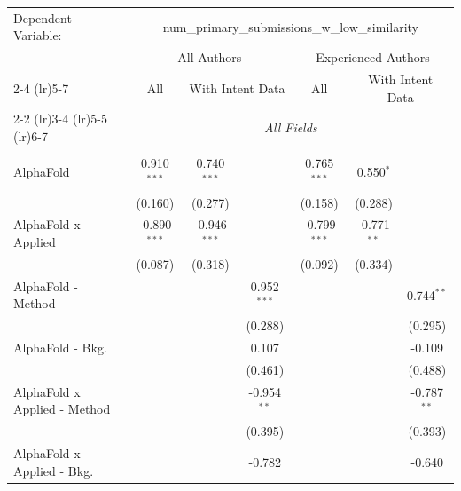 \begingroup
\centering
\begin{tabular}{lcccccc}
   \tabularnewline \midrule \midrule
   Dependent Variable: & \multicolumn{6}{c}{num\_primary\_submissions\_w\_low\_similarity}\\
 & \multicolumn{3}{c}{All Authors} & \multicolumn{3}{c}{Experienced Authors} \\
\cmidrule(lr){2-4} \cmidrule(lr){5-7}
 & \multicolumn{1}{c}{All} & \multicolumn{2}{c}{With Intent Data} & \multicolumn{1}{c}{All} & \multicolumn{2}{c}{With Intent Data} \\
\cmidrule(lr){2-2} \cmidrule(lr){3-4} \cmidrule(lr){5-5} \cmidrule(lr){6-7}
 & \multicolumn{6}{c}{\textit{All Fields}} \\ \\
   AlphaFold                      & 0.910$^{***}$  & 0.740$^{***}$  &               & 0.765$^{***}$  & 0.550$^{*}$   &   \\   
                                  & (0.160)        & (0.277)        &               & (0.158)        & (0.288)       &   \\   
   AlphaFold x Applied            & -0.890$^{***}$ & -0.946$^{***}$ &               & -0.799$^{***}$ & -0.771$^{**}$ &   \\   
                                  & (0.087)        & (0.318)        &               & (0.092)        & (0.334)       &   \\   
   AlphaFold - Method             &                &                & 0.952$^{***}$ &                &               & 0.744$^{**}$\\   
                                  &                &                & (0.288)       &                &               & (0.295)\\   
   AlphaFold - Bkg.               &                &                & 0.107         &                &               & -0.109\\   
                                  &                &                & (0.461)       &                &               & (0.488)\\   
   AlphaFold x Applied - Method   &                &                & -0.954$^{**}$ &                &               & -0.787$^{**}$\\   
                                  &                &                & (0.395)       &                &               & (0.393)\\   
   AlphaFold x Applied - Bkg.     &                &                & -0.782        &                &               & -0.640\\   

\end{tabular}
